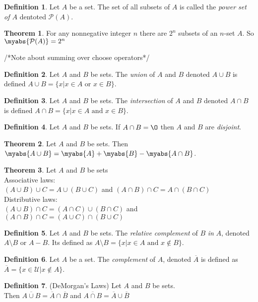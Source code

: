 \documentclass[11pt]{article}
\theoremstyle{definition}
\newtheorem{theorem}{Theorem}[section]
\newtheorem{definition}{Definition}[section]
\begin{document}
\begin{definition}
    Let $A$ be a set. The set of all subsets of $A$ is called the \emph{power set of $A$} dentoted $\mathcal{P}(A)$.
\end{definition}
\begin{theorem}
    For any nonnegative integer $n$ there are $2^n$ subsets of an $n$-set $A$. So $\myabs{\mathcal{P}(A)} = 2^n$
\end{theorem}
/*Note about summing over choose operators*/
\begin{definition}
    Let $A$ and $B$ be sets. The \emph{union} of $A$ and $B$ denoted $A \cup B$ is defined $A \cup B = \{ x \vert x \in A \text{ or } x \in B \}$.
\end{definition}
\begin{definition}
    Let $A$ and $B$ be sets. The \emph{intersection} of $A$ and $B$ denoted $A \cap B$ is defined $A \cap B = \{ x \vert x \in A \text{ and } x \in B \}$.
\end{definition}
\begin{definition}
    Let $A$ and $B$ be sets. If $A \cap B = \O$ then $A$ and $B$ are \emph{disjoint}.
\end{definition}
\begin{theorem}
    Let $A$ and $B$ be sets. Then $\myabs{A \cup B} = \myabs{A} + \myabs{B} - \myabs{A \cap B}$.
\end{theorem}
\begin{theorem} 
    Let $A$ and $B$ be sets \\ Associative laws:\\
    $(A \cup B) \cup C = A \cup (B \cup C)$ and 
    $(A \cap B) \cap C = A \cap (B \cap C)$ \\
    Distributive laws:\\
    $(A \cup B) \cap C = (A \cap C) \cup (B \cap C)$ and
    $(A \cap B) \cap C = (A \cup C) \cap (B \cup C)$
\end{theorem}
\begin{definition}
    Let $A$ and $B$ be sets. The \emph{relative complement} of $B$ \emph{in} $A$, denoted $A \setminus B$ or $A - B$. Its defined as $A \setminus B = \{ x \vert x \in A \text{ and } x \notin B \}$.
\end{definition}
\begin{definition}
    Let $A$ be a set. The \emph{complement} of $A$, denoted $\overline{A}$ is defined as $\overline{A} = \{ x \in \mathcal{U} \vert x \notin A \}$.
\end{definition}
\begin{definition} (DeMorgan's Laws) Let $A$ and $B$ be sets. \\
    Then $\overline{A \cup B} = \overline{A} \cap \overline{B}$ and $\overline{A \cap B} = \overline{A} \cup \overline{B}$
\end{definition}
\end{document}
